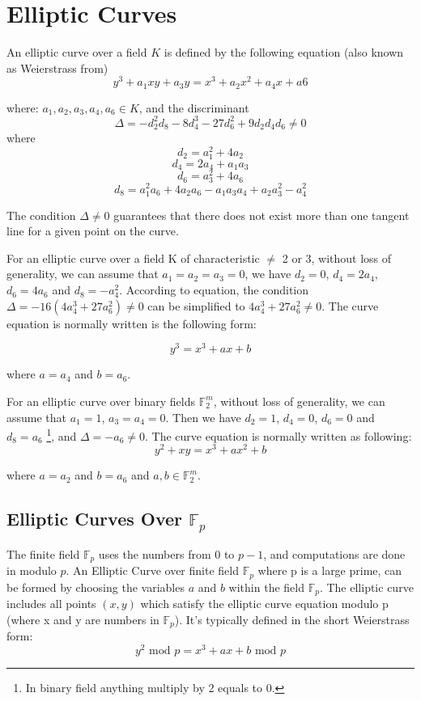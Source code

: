 \section{Elliptic Curves} \label{sec:EC}
An elliptic curve over a field $K$ is defined by the following equation (also known as Weierstrass from)
\begin{equation} \label{eq:ECWeierstrass}
y^3+a_1xy+a_3y = x^3 + a_2x^2+a_4x+a6
\end{equation}

where: $a_1,a_2,a_3,a_4,a_6 \in K$, and the discriminant 
 $$\Delta=-d^{2}_{2}d_{8}-8d_{4}^{3}-27d_{6}^{2}+9d_{2}d_{4}d_{6} \neq 0$$
where  
$$d_{2}=a_{1}^{2}+4a_{2}$$  $$d_{4}=2a_{4}+a_1a_3$$  $$d_6=a_{3}^{2}+4a_6$$  $$d_8=a_{1}^{2}a_6+4a_2a_6-a_1a_3a_4+a_2a_{3}^{2}-a_{4}^{2}$$

The condition $\Delta \neq 0$ guarantees that there does not exist more than one tangent line for a given point on the curve.

For an elliptic curve over a field K of characteristic $\neq$ 2 or 3, without loss of generality, we can assume that $a_1=a_2=a_3=0$, we have $d_2=0$, $d_4=2a_4$, $d_6 = 4a_6$ and $d_8=-a_{4}^{2}$. According to equation, the condition $\Delta = -16(4a_4^3+27a_6^2) \neq 0$ can be simplified to $4a_4^3+27a_6^2 \neq 0$. The curve equation is normally written is the following form:

\begin{equation} \label{eq:ECFp}
y^3=x^3+ax+b
\end{equation}

where $a=a_4$ and $b=a_6$.

For an elliptic curve over binary fields $\mathbb{F}_2^m$, without loss of generality, we can assume that $a_1=1$, $a_3=a_4=0$. Then we have $d_2=1$, $d_4=0$, $d_6=0$ and $d_8=a_6$ \footnote{In binary field anything multiply by 2 equals to 0.}, and $\Delta = -a_6 \neq 0$. The curve equation is normally written as following: 
\begin{equation}\label{eq:ECF2m}
y^2+xy=x^3+ax^2+b
\end{equation}

where $ a = a_2$ and $b = a_6$ and $a,b \in \mathbb{F}_2^m$. 

\subsection{Elliptic Curves Over $\mathbb{F}_p$}
The finite field $\mathbb{F}_p$ uses the numbers from 0 to $p-1$, and computations are done in modulo $p$. An Elliptic Curve over finite field $\mathbb{F}_p$ where p is a large prime, can be formed by choosing the variables $a$ and $b$ within the field $\mathbb{F}_p$. The elliptic curve includes all points $(x,y)$ which satisfy the elliptic curve equation modulo p (where x and y are numbers in $\mathbb{F}_p$). It's typically defined in the short Weierstrass form:
$$y^2 \text{ mod } p= x^3 + ax + b \text{ mod } p$$

